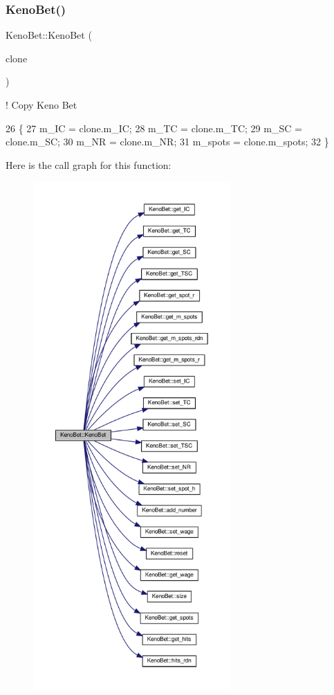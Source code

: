 \subsubsection{\texorpdfstring{Keno\+Bet()}{KenoBet()}\hspace{0.1cm}{\footnotesize\ttfamily [2/2]}}
{\footnotesize\ttfamily Keno\+Bet\+::\+Keno\+Bet (\begin{DoxyParamCaption}\item[{const \hyperlink{classKenoBet}{Keno\+Bet} \&}]{clone }\end{DoxyParamCaption})\hspace{0.3cm}{\ttfamily [inline]}}



! Copy Keno Bet 


\begin{DoxyCode}
26         \{
27             m\_IC = clone.m\_IC;
28             m\_TC = clone.m\_TC;
29             m\_SC = clone.m\_SC;
30             m\_NR = clone.m\_NR;
31             m\_spots = clone.m\_spots;
32         \}
\end{DoxyCode}
Here is the call graph for this function\+:
\nopagebreak
\begin{figure}[H]
\begin{center}
\leavevmode
\includegraphics[height=550pt]{classKenoBet_aaabc53c7d5505c3aae1de7b685f72f05_cgraph}
\end{center}
\end{figure}


